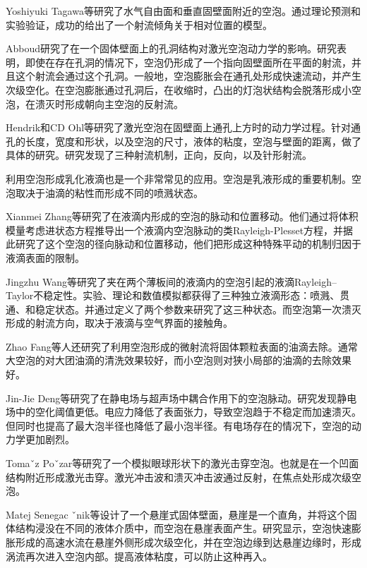 Yoshiyuki Tagawa等研究了水气自由面和垂直固壁面附近的空泡\cite{kiyama_direction_2021}。通过理论预测和实验验证，成功的给出了一个射流倾角关于相对位置的模型。

Abboud研究了在一个固体壁面上的孔洞结构对激光空泡动力学的影响\cite{abboud_microjetting_2013}。研究表明，即使在存在孔洞的情况下，空泡仍形成了一个指向固壁面所在平面的射流，并且这个射流会通过这个孔洞。一般地，空泡膨胀会在通孔处形成快速流动，并产生次级空化。在空泡膨胀通过孔洞后，在收缩时，凸出的灯泡状结构会脱落形成小空泡，在溃灭时形成朝向主空泡的反射流。

Hendrik和CD Ohl等研究了激光空泡在固壁面上通孔上方时的动力学过程\cite{reese_microscopic_2022}。针对通孔的长度，宽度和形状，以及空泡的尺寸，液体的粘度，空泡与壁面的距离，做了具体的研究。研究发现了三种射流机制，正向，反向，以及针形射流。

利用空泡形成乳化液滴也是一个非常常见的应用\cite{raman_microemulsification_2022,nieves_ultrasound-assisted_2021}。空泡是乳液形成的重要机制。空泡取决于油滴的粘性而形成不同的喷溅状态。

Xianmei Zhang等研究了在液滴内形成的空泡的脉动和位置移动\cite{zhang_radial_2022}。他们通过将体积模量考虑进状态方程推导出一个液滴内空泡脉动的类Rayleigh-Plesset方程，并据此研究了这个空泡的径向脉动和位置移动，他们把形成这种特殊平动的机制归因于液滴表面的限制。

Jingzhu Wang等研究了夹在两个薄板间的液滴内的空泡引起的液滴Rayleigh–Taylor不稳定性\cite{wang_rayleightaylor_2021}。实验、理论和数值模拟都获得了三种独立液滴形态：喷溅、贯通、和稳定状态。并通过定义了两个参数来研究了这三种状态。而空泡第一次溃灭形成的射流方向，取决于液滴与空气界面的接触角。

Zhao Fang等人还研究了利用空泡形成的微射流将固体颗粒表面的油滴去除\cite{zhao_numerical_2021}。通常大空泡的对大团油滴的清洗效果较好，而小空泡则对狭小局部的油滴的去除效果好。

Jin-Jie Deng等研究了在静电场与超声场中耦合作用下的空泡脉动\cite{deng_dynamics_2021}。研究发现静电场中的空化阈值更低。电应力降低了表面张力，导致空泡趋于不稳定而加速溃灭。但同时也提高了最大泡半径也降低了最小泡半径。有电场存在的情况下，空泡的动力学更加剧烈。

Tomaˇz Poˇzar等研究了一个模拟眼球形状下的激光击穿空泡\cite{pozar_laser-induced_2021}。也就是在一个凹面结构附近形成激光击穿。激光冲击波和溃灭冲击波通过反射，在焦点处形成次级空泡。

Matej Senegac ˇnik等设计了一个悬崖式固体壁面，悬崖是一个直角，并将这个固体结构浸没在不同的液体介质中，而空泡在悬崖表面产生\cite{senegacnik_dynamics_2021}。研究显示，空泡快速膨胀形成的高速水流在悬崖外侧形成次级空化，并在空泡边缘到达悬崖边缘时，形成涡流再次进入空泡内部。提高液体粘度，可以防止这种再入。

